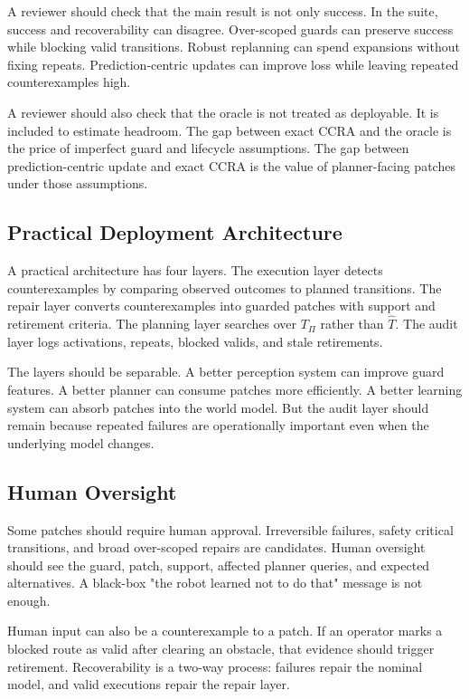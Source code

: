 \documentclass{article}
\newcommand{\ccra}{\textsc{CCRA}}
\newcommand{\model}{\hat{T}}
\newcommand{\patched}{T_{\Pi}}
\begin{document}
A reviewer should check that the main result is not only success. In the suite,
success and recoverability can disagree. Over-scoped guards can preserve
success while blocking valid transitions. Robust replanning can spend expansions
without fixing repeats. Prediction-centric updates can improve loss while
leaving repeated counterexamples high.

A reviewer should also check that the oracle is not treated as deployable. It
is included to estimate headroom. The gap between exact \ccra{} and the oracle
is the price of imperfect guard and lifecycle assumptions. The gap between
prediction-centric update and exact \ccra{} is the value of planner-facing
patches under those assumptions.

\subsection{Practical Deployment Architecture}

A practical architecture has four layers. The execution layer detects
counterexamples by comparing observed outcomes to planned transitions. The
repair layer converts counterexamples into guarded patches with support and
retirement criteria. The planning layer searches over $\patched$ rather than
$\model$. The audit layer logs activations, repeats, blocked valids, and stale
retirements.

The layers should be separable. A better perception system can improve guard
features. A better planner can consume patches more efficiently. A better
learning system can absorb patches into the world model. But the audit layer
should remain because repeated failures are operationally important even when
the underlying model changes.

\subsection{Human Oversight}

Some patches should require human approval. Irreversible failures, safety
critical transitions, and broad over-scoped repairs are candidates. Human
oversight should see the guard, patch, support, affected planner queries, and
expected alternatives. A black-box "the robot learned not to do that" message
is not enough.

Human input can also be a counterexample to a patch. If an operator marks a
blocked route as valid after clearing an obstacle, that evidence should trigger
retirement. Recoverability is a two-way process: failures repair the nominal
model, and valid executions repair the repair layer.
\end{document}
